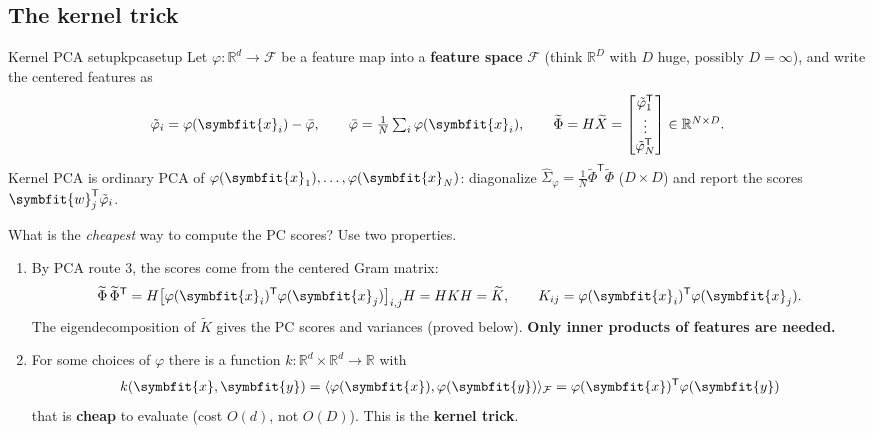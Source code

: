 \documentclass[11pt]{article}
\newcommand{\bm}[1]{\symbfit{#1}}
\newcommand{\R}{\mathbb{R}}
\newcommand{\vx}{\bm{x}}
\newcommand{\vy}{\bm{y}}
\newcommand{\vw}{\bm{w}}
\newcommand{\Sig}{\widehat{\Sigma}}
\newcommand{\T}{^{\mathsf T}}
\begin{document}
\subsection{The kernel trick}

\begin{definition}{Kernel PCA setup}{kpcasetup}
Let $\varphi:\R^d\to\mathcal F$ be a feature map into a \textbf{feature space} $\mathcal F$
(think $\R^{D}$ with $D$ huge, possibly $D=\infty$), and write the centered features as
\[
\tilde\varphi_i=\varphi(\vx_i)-\bar{\varphi},\qquad \bar{\varphi}=\tfrac1N\textstyle\sum_{i}\varphi(\vx_i),\qquad
\widetilde\Phi=H\widetilde X=\begin{bmatrix}\tilde\varphi_1\T\\\vdots\\\tilde\varphi_N\T\end{bmatrix}\in\R^{N\times D}.
\]
Kernel PCA is ordinary PCA of $\varphi(\vx_1),\dots,\varphi(\vx_N)$: diagonalize
$\Sig_\varphi=\tfrac1N\widetilde\Phi\T\widetilde\Phi$ ($D\times D$) and report the scores
$\vw_j\T\tilde\varphi_i$.
\end{definition}

What is the \emph{cheapest} way to compute the PC scores? Use two properties.
\begin{enumerate}
\item By PCA route 3, the scores come from the centered Gram matrix:
\[
\widetilde\Phi\,\widetilde\Phi\T=H\big[\varphi(\vx_i)\T\varphi(\vx_j)\big]_{i,j}H=HKH=\widetilde K,
\qquad K_{ij}=\varphi(\vx_i)\T\varphi(\vx_j).
\]
The eigendecomposition of $\widetilde K$ gives the PC scores and variances (proved below). \textbf{Only inner products of features are needed.}
\item For some choices of $\varphi$ there is a function $k:\R^d\times\R^d\to\R$ with
\[
k(\vx,\vy)=\langle\varphi(\vx),\varphi(\vy)\rangle_{\mathcal F}=\varphi(\vx)\T\varphi(\vy)
\]
that is \textbf{cheap} to evaluate (cost $O(d)$, not $O(D)$). This is the \textbf{kernel trick}.
\end{enumerate}
\end{document}
